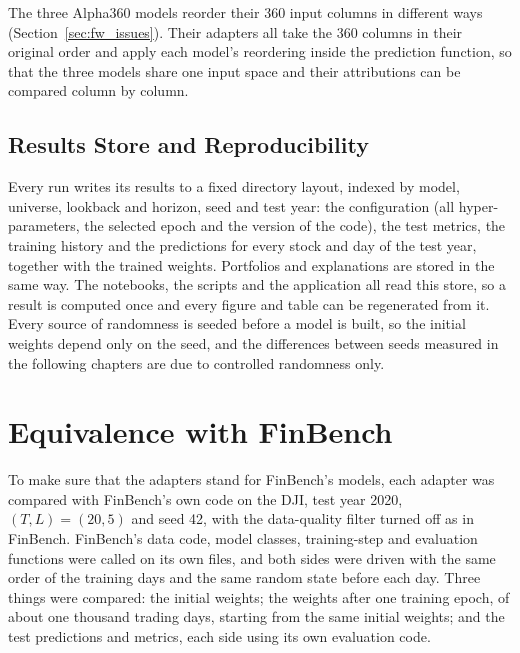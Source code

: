 The three Alpha360 models reorder their 360 input columns in different ways (Section~\ref{sec:fw_issues}). Their adapters all take the 360 columns in their original order and apply each model's reordering inside the prediction function, so that the three models share one input space and their attributions can be compared column by column.

\subsection{Results Store and Reproducibility}

Every run writes its results to a fixed directory layout, indexed by model, universe, lookback and horizon, seed and test year: the configuration (all hyper-parameters, the selected epoch and the version of the code), the test metrics, the training history and the predictions for every stock and day of the test year, together with the trained weights. Portfolios and explanations are stored in the same way. The notebooks, the scripts and the application all read this store, so a result is computed once and every figure and table can be regenerated from it. Every source of randomness is seeded before a model is built, so the initial weights depend only on the seed, and the differences between seeds measured in the following chapters are due to controlled randomness only.

\section{Equivalence with FinBench}
\label{sec:fw_equivalence}

To make sure that the adapters stand for FinBench's models, each adapter was compared with FinBench's own code on the DJI, test year 2020, $(T, L) = (20, 5)$ and seed 42, with the data-quality filter turned off as in FinBench. FinBench's data code, model classes, training-step and evaluation functions were called on its own files, and both sides were driven with the same order of the training days and the same random state before each day. Three things were compared: the initial weights; the weights after one training epoch, of about one thousand trading days, starting from the same initial weights; and the test predictions and metrics, each side using its own evaluation code.

